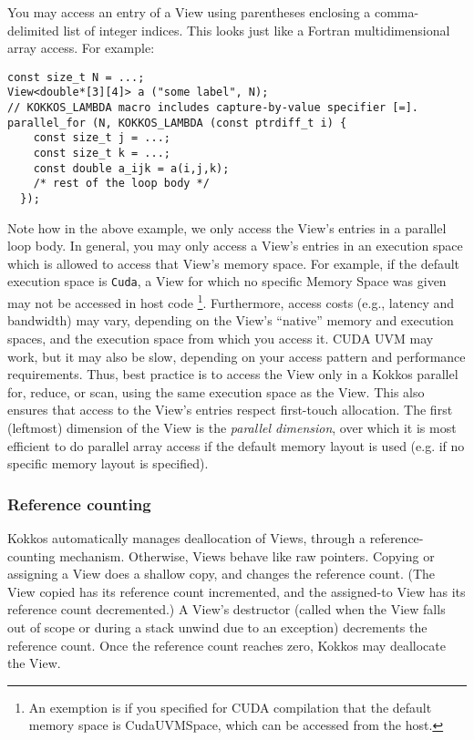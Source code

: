 You may access an entry of a View using parentheses enclosing a
comma-delimited list of integer indices.  This looks just like a
Fortran multidimensional array access.  For example:
\begin{lstlisting}
const size_t N = ...;
View<double*[3][4]> a ("some label", N);
// KOKKOS_LAMBDA macro includes capture-by-value specifier [=].
parallel_for (N, KOKKOS_LAMBDA (const ptrdiff_t i) {
    const size_t j = ...;
    const size_t k = ...;
    const double a_ijk = a(i,j,k);
    /* rest of the loop body */
  });
\end{lstlisting}
Note how in the above example, we only access the View's entries in a
parallel loop body.  In general, you may only access a View's entries
in an execution space which is allowed to access that View's memory
space.  For example, if the default execution space is \lstinline!Cuda!, 
a View for which no specific Memory Space was given may not be accessed 
in host code \footnote{An exemption is if you specified for CUDA compilation
that the default memory space is CudaUVMSpace, which can be accessed from 
the host.}.
Furthermore, access costs (e.g., latency and
bandwidth) may vary, depending on the View's ``native'' memory and
execution spaces, and the execution space from which you access it.
CUDA UVM may work, but it may also be slow, depending on your access
pattern and performance requirements.  Thus, best practice is to
access the View only in a Kokkos parallel for, reduce, or scan, using
the same execution space as the View.  This also ensures that access
to the View's entries respect first-touch allocation.  The first
(leftmost) dimension of the View is the \emph{parallel dimension},
over which it is most efficient to do parallel array access if the 
default memory layout is used (e.g. if no specific memory layout is 
specified).

\subsubsection{Reference counting}

Kokkos automatically manages deallocation of Views, through a
reference-counting mechanism.  Otherwise, Views behave like raw
pointers.  Copying or assigning a View does a shallow copy, and
changes the reference count.  (The View copied has its reference count
incremented, and the assigned-to View has its reference count
decremented.)  A View's destructor (called when the View falls out of
scope or during a stack unwind due to an exception) decrements the
reference count.  Once the reference count reaches zero, Kokkos may
deallocate the View.

